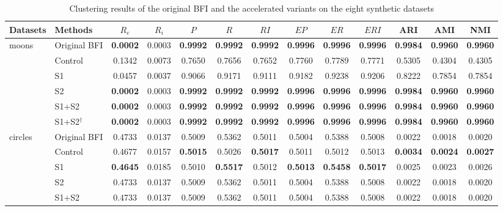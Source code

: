 \begin{table}[!t]
\centering
\caption{Clustering results of the original BFI and the accelerated variants on the eight synthetic datasets}
\label{tab:synthetic}
\scriptsize
\setlength{\tabcolsep}{4.2pt}
\begin{tabular}{llccccccccccc}
\toprule
Datasets & Methods & $R_e$ & $R_i$ & $P$ & $R$ & $RI$ & $EP$ & $ER$ & $ERI$ & ARI & AMI & NMI \\
\midrule
\multirow{6}{*}{moons} & Original BFI & \textbf{0.0002} & 0.0003 & \textbf{0.9992} & \textbf{0.9992} & \textbf{0.9992} & \textbf{0.9996} & \textbf{0.9996} & \textbf{0.9996} & \textbf{0.9984} & \textbf{0.9960} & \textbf{0.9960} \\
 & Control & 0.1342 & 0.0073 & 0.7650 & 0.7656 & 0.7652 & 0.7760 & 0.7789 & 0.7771 & 0.5305 & 0.4304 & 0.4305 \\
 & S1 & 0.0457 & 0.0037 & 0.9066 & 0.9171 & 0.9111 & 0.9182 & 0.9238 & 0.9206 & 0.8222 & 0.7854 & 0.7854 \\
 & S2 & \textbf{0.0002} & 0.0003 & \textbf{0.9992} & \textbf{0.9992} & \textbf{0.9992} & \textbf{0.9996} & \textbf{0.9996} & \textbf{0.9996} & \textbf{0.9984} & \textbf{0.9960} & \textbf{0.9960} \\
 & S1+S2 & \textbf{0.0002} & 0.0003 & \textbf{0.9992} & \textbf{0.9992} & \textbf{0.9992} & \textbf{0.9996} & \textbf{0.9996} & \textbf{0.9996} & \textbf{0.9984} & \textbf{0.9960} & \textbf{0.9960} \\
 & S1+S2$^{\dagger}$ & \textbf{0.0002} & 0.0003 & \textbf{0.9992} & \textbf{0.9992} & \textbf{0.9992} & \textbf{0.9996} & \textbf{0.9996} & \textbf{0.9996} & \textbf{0.9984} & \textbf{0.9960} & \textbf{0.9960} \\
\midrule
\multirow{6}{*}{circles} & Original BFI & 0.4733 & 0.0137 & 0.5009 & 0.5362 & 0.5011 & 0.5004 & 0.5388 & 0.5008 & 0.0022 & 0.0018 & 0.0020 \\
 & Control & 0.4677 & 0.0157 & \textbf{0.5015} & 0.5026 & \textbf{0.5017} & 0.5011 & 0.5012 & 0.5013 & \textbf{0.0034} & \textbf{0.0024} & \textbf{0.0027} \\
 & S1 & \textbf{0.4645} & 0.0185 & 0.5010 & \textbf{0.5517} & 0.5012 & \textbf{0.5013} & \textbf{0.5458} & \textbf{0.5017} & 0.0025 & 0.0023 & 0.0026 \\
 & S2 & 0.4733 & 0.0137 & 0.5009 & 0.5362 & 0.5011 & 0.5004 & 0.5388 & 0.5008 & 0.0022 & 0.0018 & 0.0020 \\
 & S1+S2 & 0.4733 & 0.0137 & 0.5009 & 0.5362 & 0.5011 & 0.5004 & 0.5388 & 0.5008 & 0.0022 & 0.0018 & 0.0020 \\

\end{tabular}
\end{table}
